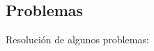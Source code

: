 \subsection{Problemas}

Resolución de algunos problemas:

\inputminted{cpp}{../CodeForces/CPP/PetrAndACombinationLock.cpp}
